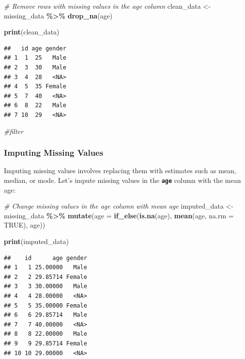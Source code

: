 \documentclass[
]{book}
\newenvironment{Shaded}{\begin{snugshade}}{\end{snugshade}}
\newcommand{\AttributeTok}[1]{\textcolor[rgb]{0.13,0.29,0.53}{#1}}
\newcommand{\CommentTok}[1]{\textcolor[rgb]{0.56,0.35,0.01}{\textit{#1}}}
\newcommand{\ConstantTok}[1]{\textcolor[rgb]{0.56,0.35,0.01}{#1}}
\newcommand{\FunctionTok}[1]{\textcolor[rgb]{0.13,0.29,0.53}{\textbf{#1}}}
\newcommand{\NormalTok}[1]{#1}
\newcommand{\OtherTok}[1]{\textcolor[rgb]{0.56,0.35,0.01}{#1}}
\newcommand{\SpecialCharTok}[1]{\textcolor[rgb]{0.81,0.36,0.00}{\textbf{#1}}}
\begin{document}
\begin{Shaded}
\begin{Highlighting}[]
\CommentTok{\# Remove rows with missing values in the age column}
\NormalTok{clean\_data }\OtherTok{\textless{}{-}}\NormalTok{ missing\_data }\SpecialCharTok{\%\textgreater{}\%}
  \FunctionTok{drop\_na}\NormalTok{(age)}

\FunctionTok{print}\NormalTok{(clean\_data)}
\end{Highlighting}
\end{Shaded}

\begin{verbatim}
##   id age gender
## 1  1  25   Male
## 2  3  30   Male
## 3  4  28   <NA>
## 4  5  35 Female
## 5  7  40   <NA>
## 6  8  22   Male
## 7 10  29   <NA>
\end{verbatim}

\begin{Shaded}
\begin{Highlighting}[]
\CommentTok{\#filter}
\end{Highlighting}
\end{Shaded}

\hypertarget{imputing-missing-values}{%
\subsubsection{Imputing Missing Values}\label{imputing-missing-values}}

Imputing missing values involves replacing them with estimates such as mean, median, or mode. Let's impute missing values in the \textbf{\texttt{age}} column with the mean age:

\begin{Shaded}
\begin{Highlighting}[]
\CommentTok{\# Change missing values in the age column with mean age}
\NormalTok{imputed\_data }\OtherTok{\textless{}{-}}\NormalTok{ missing\_data }\SpecialCharTok{\%\textgreater{}\%}
  \FunctionTok{mutate}\NormalTok{(}\AttributeTok{age =} \FunctionTok{if\_else}\NormalTok{(}\FunctionTok{is.na}\NormalTok{(age), }\FunctionTok{mean}\NormalTok{(age, }\AttributeTok{na.rm =} \ConstantTok{TRUE}\NormalTok{), age))}

\FunctionTok{print}\NormalTok{(imputed\_data)}
\end{Highlighting}
\end{Shaded}

\begin{verbatim}
##    id      age gender
## 1   1 25.00000   Male
## 2   2 29.85714 Female
## 3   3 30.00000   Male
## 4   4 28.00000   <NA>
## 5   5 35.00000 Female
## 6   6 29.85714   Male
## 7   7 40.00000   <NA>
## 8   8 22.00000   Male
## 9   9 29.85714 Female
## 10 10 29.00000   <NA>
\end{verbatim}
\end{document}
